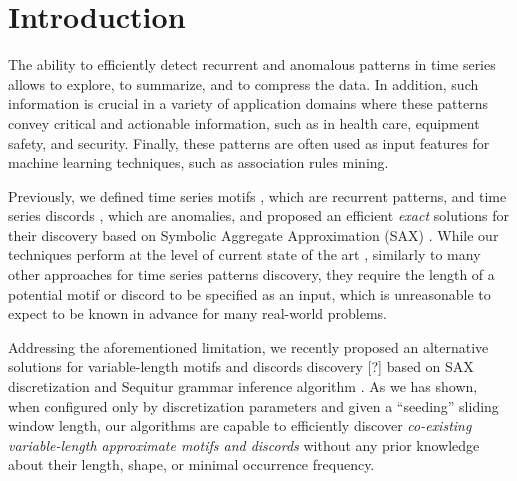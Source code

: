 \documentclass{llncs}
\begin{document}

\section{Introduction}
The ability to efficiently detect recurrent and anomalous patterns in time series allows to explore, to summarize, and to compress the data. In addition, such information is crucial in a variety of application domains where these patterns convey critical and actionable information, such as in health care, equipment safety, and security. Finally, these patterns are often used as input features for machine learning techniques, such as association rules mining. %

Previously, we defined time series motifs \cite{lin_motifs}, which are recurrent patterns, and time series discords \cite{hot_sax}, which are anomalies, and proposed an efficient \textit{exact} solutions for their discovery based on Symbolic Aggregate Approximation (SAX) \cite{sax}. While our techniques perform at the level of current state of the art \cite{chan_anomaly}, similarly to many other approaches for time series patterns discovery, they require the length of a potential motif or discord to be specified as an input, which is unreasonable to expect to be known in advance for many real-world problems.

Addressing the aforementioned limitation, we recently proposed an alternative solutions for variable-length motifs \cite{grammarviz} and discords discovery [?] based on SAX discretization and Sequitur grammar inference algorithm \cite{sequitur}. As we has shown, when configured only by discretization parameters and given a ``seeding'' sliding window length, our algorithms are capable to efficiently discover \textit{co-existing variable-length approximate motifs and discords} without any prior knowledge about their length, shape, or minimal occurrence frequency.
\end{document}
